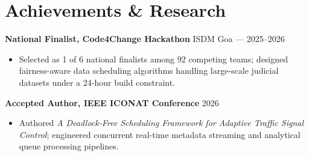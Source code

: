 \documentclass[a4paper,10pt]{article}
\begin{document}
\vspace{2pt}


\section*{Achievements \& Research}

\textbf{National Finalist, Code4Change Hackathon} \hfill ISDM Goa --- 2025--2026
\begin{itemize}[leftmargin=*,noitemsep,topsep=1pt,parsep=0pt,partopsep=0pt,itemsep=1pt]
\item Selected as 1 of 6 national finalists among 92 competing teams; designed fairness-aware data scheduling algorithms handling large-scale judicial datasets under a 24-hour build constraint.
\end{itemize}

\textbf{Accepted Author, IEEE ICONAT Conference} \hfill 2026
\begin{itemize}[leftmargin=*,noitemsep,topsep=1pt,parsep=0pt,partopsep=0pt,itemsep=1pt]
\item Authored \textit{A Deadlock-Free Scheduling Framework for Adaptive Traffic Signal Control}; engineered concurrent real-time metadata streaming and analytical queue processing pipelines.
\end{itemize}
\end{document}
